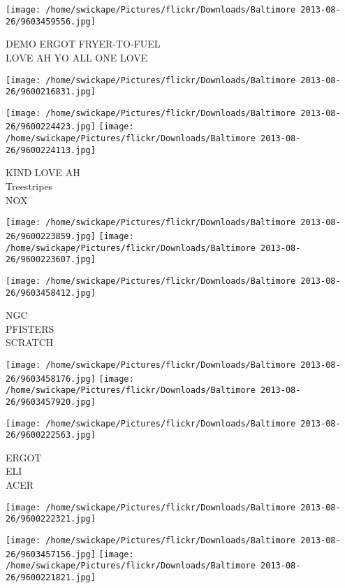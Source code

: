 \documentclass[10pt,letterpaper]{article}
\begin{document}
\vspace{0.25in}
\texttt{[image: /home/swickape/Pictures/flickr/Downloads/Baltimore 2013-08-26/9603459556.jpg]}

DEMO ERGOT FRYER{-}TO{-}FUEL\\
LOVE AH YO ALL ONE LOVE
\pagebreak

\texttt{[image: /home/swickape/Pictures/flickr/Downloads/Baltimore 2013-08-26/9600216831.jpg]}

\vspace{0.25in}
\texttt{[image: /home/swickape/Pictures/flickr/Downloads/Baltimore 2013-08-26/9600224423.jpg]}
\texttt{[image: /home/swickape/Pictures/flickr/Downloads/Baltimore 2013-08-26/9600224113.jpg]}

KIND LOVE AH\\
Treestripes\\
NOX
\pagebreak

\texttt{[image: /home/swickape/Pictures/flickr/Downloads/Baltimore 2013-08-26/9600223859.jpg]}
\texttt{[image: /home/swickape/Pictures/flickr/Downloads/Baltimore 2013-08-26/9600223607.jpg]}

\vspace{0.25in}
\texttt{[image: /home/swickape/Pictures/flickr/Downloads/Baltimore 2013-08-26/9603458412.jpg]}

NGC\\
PFISTERS\\
SCRATCH
\pagebreak

\texttt{[image: /home/swickape/Pictures/flickr/Downloads/Baltimore 2013-08-26/9603458176.jpg]}
\texttt{[image: /home/swickape/Pictures/flickr/Downloads/Baltimore 2013-08-26/9603457920.jpg]}

\texttt{[image: /home/swickape/Pictures/flickr/Downloads/Baltimore 2013-08-26/9600222563.jpg]}

ERGOT\\
ELI\\
ACER
\pagebreak

\texttt{[image: /home/swickape/Pictures/flickr/Downloads/Baltimore 2013-08-26/9600222321.jpg]}

\vspace{0.25in}
\texttt{[image: /home/swickape/Pictures/flickr/Downloads/Baltimore 2013-08-26/9603457156.jpg]}
\texttt{[image: /home/swickape/Pictures/flickr/Downloads/Baltimore 2013-08-26/9600221821.jpg]}
\end{document}
